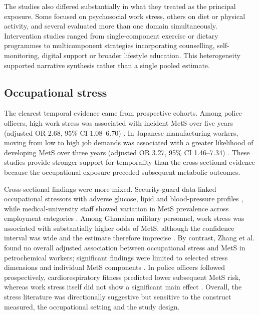 \documentclass[11pt]{article}
\begin{document}
The studies also differed substantially in what they treated as the principal exposure. Some focused on psychosocial work stress, others on diet or physical activity, and several evaluated more than one domain simultaneously. Intervention studies ranged from single-component exercise or dietary programmes to multicomponent strategies incorporating counselling, self-monitoring, digital support or broader lifestyle education. This heterogeneity supported narrative synthesis rather than a single pooled estimate.



\subsection{Occupational stress}

The clearest temporal evidence came from prospective cohorts. Among police officers, high work stress was associated with incident MetS over five years (adjusted OR 2.68, 95\% CI 1.08--6.70) \citep{Garbarino2015}. In Japanese manufacturing workers, moving from low to high job demands was associated with a greater likelihood of developing MetS over three years (adjusted OR 3.27, 95\% CI 1.46--7.34) \citep{Yamaguchi2018}. These studies provide stronger support for temporality than the cross-sectional evidence because the occupational exposure preceded subsequent metabolic outcomes.

Cross-sectional findings were more mixed. Security-guard data linked occupational stressors with adverse glucose, lipid and blood-pressure profiles \citep{Jovanovic2020}, while medical-university staff showed variation in MetS prevalence across employment categories \citep{Eftekhari2021}. Among Ghanaian military personnel, work stress was associated with substantially higher odds of MetS, although the confidence interval was wide and the estimate therefore imprecise \citep{Ayeltigah2026Military}. By contrast, Zhang et al. found no overall adjusted association between occupational stress and MetS in petrochemical workers; significant findings were limited to selected stress dimensions and individual MetS components \citep{Zhang2024}. In police officers followed prospectively, cardiorespiratory fitness predicted lower subsequent MetS risk, whereas work stress itself did not show a significant main effect \citep{Schilling2020}. Overall, the stress literature was directionally suggestive but sensitive to the construct measured, the occupational setting and the study design.
\end{document}
